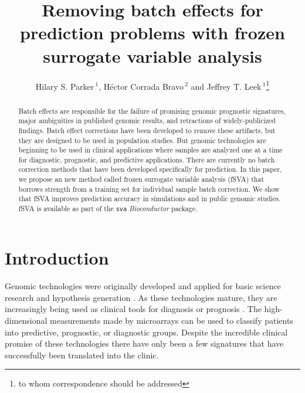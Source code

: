 \documentclass{bioinfo}
\begin{document}

\title[Frozen Surrogate Variable Analysis]{Removing batch effects for prediction problems with frozen surrogate variable analysis}
\author[Parker \textit{et~al}]{Hilary S. Parker\,$^{1}$, H\'{e}ctor Corrada Bravo\,$^{2}$ and Jeffrey T. Leek\,$^1$\footnote{to whom correspondence should be addressed}}
\address{$^{1}$Department of Biostatistics, Johns Hopkins Bloomberg School of Public Health, Baltimore, MD, 21205\\
$^{2}$Center for Bioinformatics and Computational Biology, Department of Computer Science, University of Maryland, College Park, Maryland, 20742}



\maketitle

\begin{abstract}
{Batch effects are responsible for the failure of promising genomic prognostic signatures, major ambiguities in published genomic results, and retractions of widely-publicized findings. Batch effect corrections have been developed to remove these artifacts, but they are designed to be used in population studies. But genomic technologies are beginning to be used in clinical applications where samples are analyzed one at a time for diagnostic, prognostic, and predictive applications. There are currently no batch correction methods that have been developed specifically for prediction. In this paper, we propose an new method called frozen surrogate variable analysis (fSVA) that borrows strength from a training set for individual sample batch correction. We show that fSVA improves prediction accuracy in simulations and in public genomic studies.  fSVA is available as part of the \texttt{sva} {\it Bioconductor} package.}
\end{abstract}

\section{Introduction}
Genomic technologies were originally developed and applied for basic science research and hypothesis generation \cite{Eisen1998}. As these technologies mature, they are increasingly being used as clinical tools for diagnosis or prognosis \cite{Chan2011}. The high-dimensional measurements made by microarrays can be used to classify patients into predictive, prognostic, or diagnostic groups. Despite the incredible clinical promise of these technologies there have only been a few signatures that have successfully been translated into the clinic.
\end{document}
